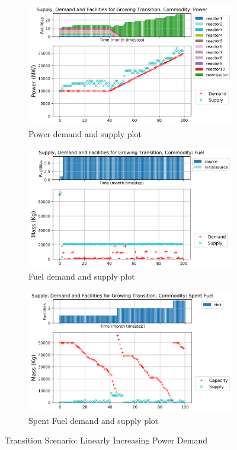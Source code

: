 \documentclass{anstrans}
\begin{document}
\begin{figure}[!htbp]
    \centering
    \begin{subfigure}[t]{\textwidth}
    \centering
        \includegraphics[width=0.8\linewidth]{figures/growingtransition-power.png} 
        \caption{Power demand and supply plot}
        \label{fig:growingtransition-power}
    \end{subfigure}
    \begin{subfigure}[t]{0.65\textwidth}
        \centering
        \includegraphics[width=\linewidth]{figures/growingtransition-fuel.png} 
        \caption{Fuel demand and supply plot}
	    \label{fig:growingtransition-fuel}
    \end{subfigure}
    \begin{subfigure}[t]{0.65\textwidth}
        \centering
        \includegraphics[width=\linewidth]{figures/growingtransition-spentfuel.png} 
        \caption{Spent Fuel demand and supply plot}
        \label{fig:growingtransition-spentfuel}
    \end{subfigure}
    \caption{Transition Scenario: Linearly Increasing Power Demand}
\end{figure}
\end{document}
